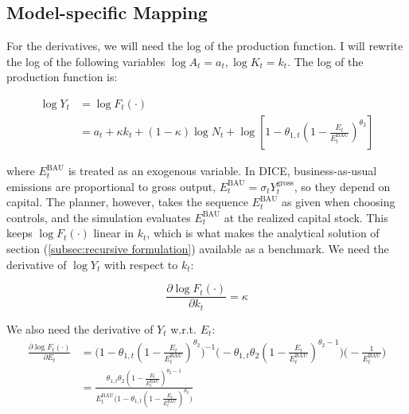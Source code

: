 \subsection{Model-specific Mapping}
For the derivatives, we will need the log of the production function. I will rewrite the log of the following variables \(\log A_t = a_t, \log K_t = k_t\). The log of the production function is:

\begin{equation}
\begin{aligned}
    \log Y_t &= \log F_t(\cdot) \\
    &=  a_t + \kappa k_t + (1-\kappa)\log N_t 
        + \log \left[ 
        1 - \theta_{1,t} \left(
            1 - \frac{E_t}{E_t^{\text{BAU}}} 
        \right)^{\theta_2}
    \right]
\end{aligned}
\end{equation}

where \(E_t^{\text{BAU}}\) is treated as an exogenous variable. In DICE, business-as-usual emissions are proportional to gross output, \(E_t^{\text{BAU}} = \sigma_t Y_t^{\text{gross}}\), so they depend on capital. The planner, however, takes the sequence \(E_t^{\text{BAU}}\) as given when choosing controls, and the simulation evaluates \(E_t^{\text{BAU}}\) at the realized capital stock. This keeps \(\log F_t(\cdot)\) linear in \(k_t\), which is what makes the analytical solution of section (\ref{subsec:recursive formulation}) available as a benchmark. We need the derivative of \(\log Y_t\) with respect to \(k_t\):

\begin{equation*}
    \frac{\partial \log F_t(\cdot)}{\partial k_t} = 
    \kappa
\end{equation*}

We also need the derivative of \(Y_t\) w.r.t. \(E_t\):
\begin{equation*}
\begin{aligned}
    \frac{\partial \log F_t(\cdot)}{\partial E_t} &=
    \Bigg( 
        1 - \theta_{1,t} \left(
            1 - \frac{E_t}{E_t^{\text{BAU}}} 
        \right)^{\theta_2}
    \Bigg)^{-1}
    \Bigg(
        - \theta_{1,t}\theta_2 \left(
        1 - \frac{E_t}{E_t^{\text{BAU}}} 
        \right)^{\theta_2-1}
    \Bigg )
    \Bigg( 
        - \frac{1}{E_t^{\text{BAU}}} 
    \Bigg) \\
    &= \frac{
        \theta_{1,t}\theta_2 \left(
        1 - \frac{E_t}{E_t^{\text{BAU}}} 
        \right)^{\theta_2-1}
    }{
        E_t^{\text{BAU}}\Bigg(1 - \theta_{1,t} \left(
            1 - \frac{E_t}{E_t^{\text{BAU}}} 
        \right)^{\theta_2} \Bigg)
    }
\end{aligned}
\end{equation*}

